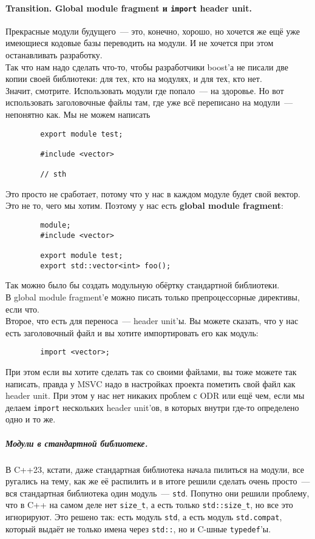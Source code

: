 \documentclass{article}
\begin{document}
    \paragraph{Transition. Global module fragment и \texttt{import} header unit.}
    Прекрасные модули будущего~--- это, конечно, хорошо, но хочется же ещё уже имеющиеся кодовые базы переводить на модули. И не хочется при этом останавливать разработку.\\
    Так что нам надо сделать что-то, чтобы разработчики boost'а не писали две копии своей библиотеки: для тех, кто на модулях, и для тех, кто нет.\\
    Значит, смотрите. Использовать модули где попало~--- на здоровье. Но вот использовать заголовочные файлы там, где уже всё переписано на модули~--- непонятно как. Мы не можем написать
    \begin{verbatim}
        export module test;

        #include <vector>

        // sth
    \end{verbatim}
    Это просто не сработает, потому что у нас в каждом модуле будет свой вектор. Это не то, чего мы хотим. Поэтому у нас есть \textbf{global module fragment}:
    \begin{verbatim}
        module;
        #include <vector>

        export module test;
        export std::vector<int> foo();
    \end{verbatim}
    Так можно было бы создать модульную обёртку стандартной библиотеки.\\
    В global module fragment'е можно писать только препроцессорные директивы, если что.\\
    Второе, что есть для переноса~--- header unit'ы. Вы можете сказать, что у нас есть заголовочный файл и вы хотите импортировать его как модуль:
    \begin{verbatim}
        import <vector>;
    \end{verbatim}
    При этом если вы хотите сделать так со своими файлами, вы тоже можете так написать, правда у MSVC надо в настройках проекта пометить свой файл как header unit. При этом у нас нет никаких проблем с ODR или ещё чем, если мы делаем \texttt{import} нескольких header unit'ов, в которых внутри где-то определено одно и то же.
    \subparagraph{Модули в стандартной библиотеке.}
    В C++23, кстати, даже стандартная библиотека начала пилиться на модули, все ругались на тему, как же её распилить и в итоге решили сделать очень просто~--- вся стандартная библиотека один модуль~--- \texttt{std}. Попутно они решили проблему, что в C++ на самом деле нет \texttt{size_t}, а есть только \texttt{std::size_t}, но все это игнорируют. Это решено так: есть модуль \texttt{std}, а есть модуль \texttt{std.compat}, который выдаёт не только имена через \texttt{std::}, но и C-шные \texttt{typedef}'ы.
\end{document}
